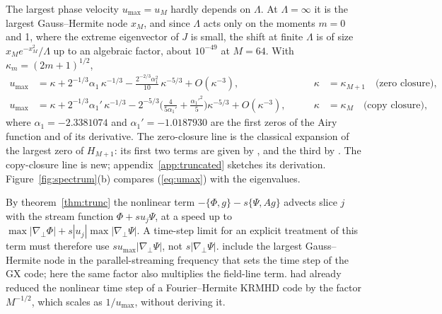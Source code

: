 The largest phase velocity $u_{\max}=u_M$ hardly depends on $\Lambda$. At $\Lambda=\infty$ it is the largest Gauss--Hermite node $x_M$, and since $\Lambda$ acts only on the moments $m=0$ and 1, where the extreme eigenvector of $J$ is small, the shift at finite $\Lambda$ is of size $x_Me^{-x_M^2}/\Lambda$ up to an algebraic factor, about $10^{-49}$ at $M=64$. With $\kappa_m=(2m+1)^{1/2}$,
\begin{equation}\label{eq:umax}
\begin{aligned}
  u_{\max}&=\kappa+2^{-1/3}\alpha_1\,\kappa^{-1/3}-\frac{2^{-2/3}\alpha_1^2}{10}\,\kappa^{-5/3}+O(\kappa^{-3}),&\qquad\kappa&=\kappa_{M+1}\quad\text{(zero closure)},\\
  u_{\max}&=\kappa+2^{-1/3}\alpha_1'\,\kappa^{-1/3}-2^{-5/3}\Big(\frac{4}{5\alpha_1'}+\frac{\alpha_1'^2}{5}\Big)\kappa^{-5/3}+O(\kappa^{-3}),&\qquad\kappa&=\kappa_M\quad\text{(copy closure)},
\end{aligned}
\end{equation}
where $\alpha_1=-2.3381074$ and $\alpha_1'=-1.0187930$ are the first zeros of the Airy function and of its derivative. The zero-closure line is the classical expansion of the largest zero of $H_{M+1}$: its first two terms are given by \citet[theorem~6.32]{Szego1975} \citep[see also][eq.~18.16.17]{DLMF}, and the third by \citet{Olver1959} \citep[eqs~12.7.2 and~12.11.9]{DLMF}. The copy-closure line is new; appendix~\ref{app:truncated} sketches its derivation. Figure~\ref{fig:spectrum}(b) compares (\ref{eq:umax}) with the eigenvalues.

By theorem~\ref{thm:trunc} the nonlinear term $-\{\Phi,g\}-s\{\Psi,Ag\}$ advects slice $j$ with the stream function $\Phi+su_j\Psi$, at a speed up to $\max|\nabla_\perp\Phi|+s|u_j|\max|\nabla_\perp\Psi|$. A time-step limit for an explicit treatment of this term must therefore use $su_{\max}|\nabla_\perp\Psi|$, not $s|\nabla_\perp\Psi|$. \citet[eq.~5.3]{Mandell2024} include the largest Gauss--Hermite node in the parallel-streaming frequency that sets the time step of the GX code; here the same factor also multiplies the field-line term. \citet[eq.~2.26]{KanekarThesis2015} had already reduced the nonlinear time step of a Fourier--Hermite KRMHD code by the factor $M^{-1/2}$, which scales as $1/u_{\max}$, without deriving it.
